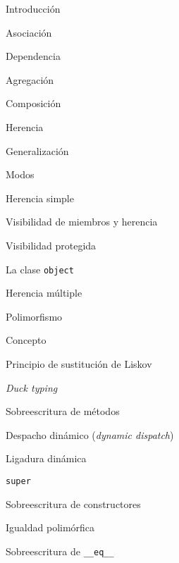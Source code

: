 \begin{longenum}
\begin{longenum}
\begin{longenum}
            \item Introducción
            \item Asociación
            \item Dependencia
            \item Agregación
            \item Composición
        \end{longenum}
        \item Herencia
        \begin{longenum}
            \item Generalización
            \item Modos
            \begin{longenum}
                \item Herencia simple
                \item Visibilidad de miembros y herencia
                \begin{longenum}
                    \item Visibilidad protegida
                \end{longenum}
                \item La clase \texttt{object}
                \item Herencia múltiple
            \end{longenum}
        \end{longenum}
        \item Polimorfismo
        \begin{longenum}
            \item Concepto
            \item Principio de sustitución de Liskov
            \item \textit{Duck typing}
            \item Sobreescritura de métodos
            \begin{longenum}
                \item Despacho dinámico (\textit{dynamic dispatch})
            \end{longenum}
            \item Ligadura dinámica
            \item \texttt{super}
            \item Sobreescritura de constructores
            \item Igualdad polimórfica
            \item Sobreescritura de \texttt{\_\_eq\_\_}
        \end{longenum}

\end{longenum}
\end{longenum}
